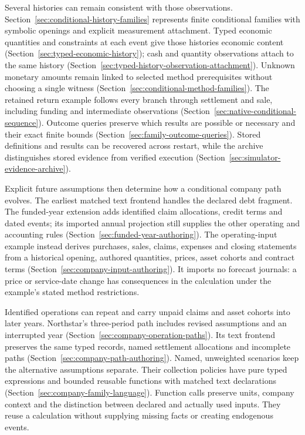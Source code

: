 Several histories can remain consistent with those observations.
Section~\ref{sec:conditional-history-families} represents finite conditional
families with symbolic openings and explicit measurement attachment.
Typed economic quantities and constraints at each event give those histories
economic content (Section~\ref{sec:typed-economic-history}); cash and
quantity observations attach to the same history
(Section~\ref{sec:typed-history-observation-attachment}).
Unknown monetary amounts remain linked to selected method prerequisites
without choosing a single witness
(Section~\ref{sec:conditional-method-families}).
The retained return example follows every branch through settlement and sale,
including funding and intermediate observations
(Section~\ref{sec:native-conditional-sequence}). Outcome queries preserve
which results are possible or necessary and their exact finite bounds
(Section~\ref{sec:family-outcome-queries}). Stored definitions and results
can be recovered across restart, while the archive distinguishes stored
evidence from verified execution
(Section~\ref{sec:simulator-evidence-archive}).

Explicit future assumptions then determine how a conditional company path
evolves. The earliest matched text frontend handles the declared debt fragment.
The funded-year extension adds identified claim allocations, credit terms
and dated events; its imported annual projection still supplies the other
operating and accounting rules (Section~\ref{sec:funded-year-authoring}).
The operating-input example instead derives purchases, sales, claims,
expenses and closing statements from a historical opening, authored
quantities, prices, asset cohorts and contract terms
(Section~\ref{sec:company-input-authoring}). It imports no forecast journals:
a price or service-date change has consequences in the calculation under the
example's stated method restrictions.

Identified operations can repeat and carry unpaid claims and asset cohorts
into later years. Northstar's three-period path includes revised assumptions
and an interrupted year (Section~\ref{sec:company-operation-paths}).
Its text frontend preserves the same typed records, named settlement
allocations and incomplete paths
(Section~\ref{sec:company-path-authoring}).
Named, unweighted scenarios keep the alternative assumptions separate.
Their collection policies have pure typed expressions and bounded reusable
functions with matched text declarations
(Section~\ref{sec:company-family-language}). Function calls preserve units,
company context and the distinction between declared and actually used
inputs. They reuse a calculation without supplying missing facts or creating
endogenous events.

